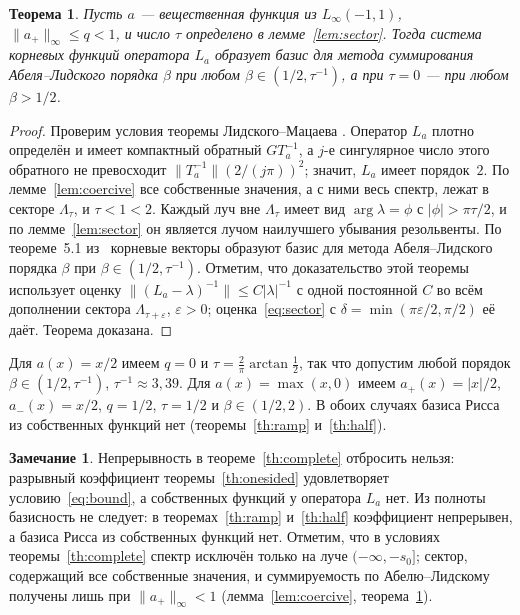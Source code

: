 \documentclass[12pt,a4paper]{article}
\newtheorem{theorem}{Теорема}
\theoremstyle{definition}
\newtheorem{remark}{Замечание}
\newcommand{\norm}[1]{\lVert#1\rVert}
\newcommand{\abs}[1]{\lvert#1\rvert}
\begin{document}
\begin{theorem}\label{th:abel}
Пусть $a$ --- вещественная функция из $L_\infty(-1,1)$, $\norm{a_+}_\infty\le q<1$, и
число $\tau$ определено в лемме~\ref{lem:sector}. Тогда система корневых функций
оператора $L_a$ образует базис для метода суммирования Абеля--Лидского порядка $\beta$
при любом $\beta\in(1/2,\tau^{-1})$, а при $\tau=0$ --- при любом $\beta>1/2$.
\end{theorem}
\begin{proof}
Проверим условия теоремы Лидского--Мацаева \cite[теорема~5.1]{Shk}. Оператор $L_a$ плотно
определён и имеет компактный обратный $GT_a^{-1}$, а $j$-е сингулярное число этого
обратного не превосходит $\norm{T_a^{-1}}(2/(j\pi))^2$; значит, $L_a$ имеет порядок~$2$.
По лемме~\ref{lem:coercive} все собственные значения, а с ними весь спектр, лежат в
секторе $\Lambda_\tau$, и $\tau<1<2$. Каждый луч вне $\Lambda_\tau$ имеет вид
$\arg\lambda=\phi$ с $\abs\phi>\pi\tau/2$, и по лемме~\ref{lem:sector} он является лучом
наилучшего убывания резольвенты. По теореме~5.1 из~\cite{Shk} корневые векторы образуют
базис для метода Абеля--Лидского порядка $\beta$ при $\beta\in(1/2,\tau^{-1})$.
Отметим, что доказательство этой теоремы использует оценку
$\norm{(L_a-\lambda)^{-1}}\le C\abs\lambda^{-1}$ с одной постоянной $C$ во всём
дополнении сектора $\Lambda_{\tau+\varepsilon}$, $\varepsilon>0$; оценка~\eqref{eq:sector}
с $\delta=\min(\pi\varepsilon/2,\pi/2)$ её даёт. Теорема доказана.
\end{proof}
Для $a(x)=x/2$ имеем $q=0$ и $\tau=\frac2\pi\arctan\frac12$, так что допустим любой
порядок $\beta\in(1/2,\tau^{-1})$, $\tau^{-1}\approx3{,}39$. Для $a(x)=\max(x,0)$ имеем
$a_+(x)=\abs x/2$, $a_-(x)=x/2$, $q=1/2$, $\tau=1/2$ и $\beta\in(1/2,2)$. В обоих случаях
базиса Рисса из собственных функций нет (теоремы~\ref{th:ramp} и~\ref{th:half}).

\begin{remark}\label{rem:complete}
Непрерывность в теореме~\ref{th:complete} отбросить нельзя: разрывный коэффициент
теоремы~\ref{th:onesided} удовлетворяет условию~\eqref{eq:bound}, а собственных функций у
оператора $L_a$ нет. Из полноты базисность не следует: в теоремах~\ref{th:ramp}
и~\ref{th:half} коэффициент непрерывен, а базиса Рисса из собственных функций нет.
Отметим, что в условиях теоремы~\ref{th:complete} спектр исключён только на луче
$(-\infty,-s_0]$; сектор, содержащий все собственные значения, и суммируемость по
Абелю--Лидскому получены лишь при $\norm{a_+}_\infty<1$ (лемма~\ref{lem:coercive},
теорема~\ref{th:abel}).
\end{remark}
\end{document}
